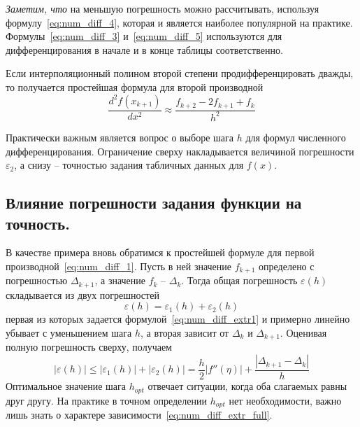 \documentclass[../../calc-math-exam-2023.tex]{subfiles}
\begin{document}
    \emph{Заметим, что} на меньшую погрешность можно рассчитывать, используя формулу~\eqref{eq:num_diff_4},
    которая и является наиболее популярной на практике. Формулы~\eqref{eq:num_diff_3} и~\eqref{eq:num_diff_5}
    используются для дифференцирования в начале и в конце таблицы соответственно.
    \vspace{10pt}

    Если интерполяционный полином второй степени продифференцировать дважды, то получается
    простейшая формула для второй производной
    \begin{equation}
        \frac{d^2 f(x_{k+1})}{dx^2} \approx \frac{f_{k+2} - 2f_{k+1} + f_k}{h^2}
    \end{equation}
    \vspace{10pt}

    Практически важным является вопрос о выборе шага $h$ для формул численного дифференцирования.
    Ограничение сверху накладывается величиной погрешности $\varepsilon_2$, а снизу --
    точностью задания табличных данных для $f(x)$.

    \subsection{Влияние погрешности задания функции на точность.}
    В качестве примера вновь обратимся к простейшей формуле для первой производной~\eqref{eq:num_diff_1}.
    Пусть в ней значение $f_{k+1}$ определено с погрешностью $\Delta_{k+1}$, а значение $f_k$ -- $\Delta_k$.
    Тогда общая погрешность $\varepsilon(h)$ складывается из двух погрешностей
    \begin{equation*}
        \varepsilon(h) = \varepsilon_1(h) + \varepsilon_2(h)
    \end{equation*}
    первая из которых задается формулой~\eqref{eq:num_diff_extr1} и примерно линейно убывает
    с уменьшением шага $h$, а вторая зависит от $\Delta_k$ и $\Delta_{k+1}$. Оценивая
    полную погрешность сверху, получаем
    \begin{equation}
        \left| \varepsilon(h) \right| \leq \left| \varepsilon_1(h) \right| + \left| \varepsilon_2(h) \right| = \frac{h}{2} \left| f''(\eta) \right| + \frac{\left| \Delta_{k+1} - \Delta_k \right|}{h} \label{eq:num_diff_extr_full}
    \end{equation}
    Оптимальное значение шага $h_{opt}$ отвечает ситуации, когда оба слагаемых равны друг другу. На практике в точном
    определении $h_{opt}$ нет необходимости, важно лишь знать о характере зависимости~\eqref{eq:num_diff_extr_full}.
\end{document}
